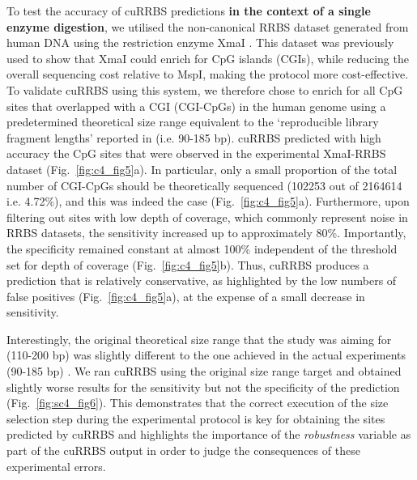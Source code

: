 To test the accuracy of cuRRBS predictions \textbf{in the context of a single enzyme digestion}, we utilised the non-canonical RRBS dataset generated from human DNA using the restriction enzyme XmaI \citep{Tanas2017}. This dataset was previously used to show that XmaI could enrich for CpG islands (\acrshort{CGI}s), while reducing the overall sequencing cost relative to MspI, making the protocol more cost-effective. To validate cuRRBS using this system, we therefore chose to enrich for all CpG sites that overlapped with a CGI (CGI-CpGs) in the human genome using a predetermined theoretical size range equivalent to the `reproducible library fragment lengths' reported in \citep{Tanas2017} (i.e. 90-185 bp). cuRRBS predicted with high accuracy the CpG sites that were observed in the experimental XmaI-RRBS dataset (Fig.~\ref{fig:c4_fig5}a). In particular, only a small proportion of the total number of CGI-CpGs should be theoretically sequenced (102253 out of 2164614 i.e. 4.72\%), and this was indeed the case (Fig.~\ref{fig:c4_fig5}a). Furthermore, upon filtering out sites with low depth of coverage, which commonly represent noise in RRBS datasets, the sensitivity increased up to approximately 80\%. Importantly, the specificity remained constant at almost 100\% independent of the threshold set for depth of coverage (Fig.~\ref{fig:c4_fig5}b). Thus, cuRRBS produces a prediction that is relatively conservative, as highlighted by the low numbers of false positives (Fig.~\ref{fig:c4_fig5}a), at the expense of a small decrease in sensitivity.

\bigskip

Interestingly, the original theoretical size range that the study was aiming for (110-200 bp) was slightly different to the one achieved in the actual experiments (90-185 bp) \citep{Tanas2017}. We ran cuRRBS using the original size range target and obtained slightly worse results for the sensitivity but not the specificity of the prediction (Fig.~\ref{fig:sc4_fig6}). This demonstrates that the correct execution of the size selection step during the experimental protocol is key for obtaining the sites predicted by cuRRBS and highlights the importance of the \textit{robustness} variable as part of the cuRRBS output in order to judge the consequences of these experimental errors.

